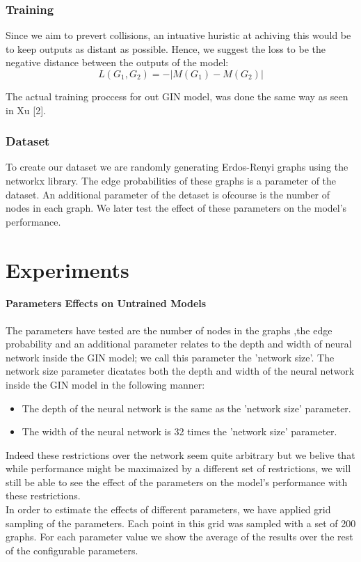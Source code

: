 \documentclass{article}
\begin{document}
\section*{Training}
Since we aim to prevert collisions, an intuative huristic at achiving this would be to keep
outputs as distant as possible.
Hence, we suggest the loss to be the negative distance between the outputs of the model:
\[
    L(G_1,G_2)=-|M(G_1)-M(G_2)|    
\]

The actual training proccess for out GIN model, was done the same way as seen in  Xu [2].

\section*{Dataset}
To create our dataset we are randomly generating Erdos-Renyi graphs using the networkx library. The edge probabilities of
these graphs is a parameter of the dataset. An additional parameter of the detaset is ofcourse is the number
of nodes in each graph. We later test the effect of these parameters on the model's performance.\\

\part*{Experiments}
\subsection*{Parameters Effects on Untrained Models}
The parameters have tested are the number of nodes in the graphs ,the edge probability and an additional parameter
relates to the depth and width of neural network inside the GIN model; we call this parameter the 'network size'.
The network size parameter dicatates both the depth and width of the neural network inside the GIN model in the following manner:
\begin{itemize}
    \item The depth of the neural network is the same as the 'network size' parameter.
    \item The width of the neural network is 32 times the 'network size' parameter.
\end{itemize}
Indeed these restrictions over the network seem quite arbitrary but we belive that while performance might be maximaized by
a different set of restrictions, we will still be able to see the effect of the parameters on the model's performance with these restrictions.\\
In order to estimate the effects of different parameters, we have applied grid sampling of the parameters.
Each point in this grid was sampled with a set of 200 graphs.
For each parameter value we show the average of the results over the rest of the configurable parameters.
\end{document}
